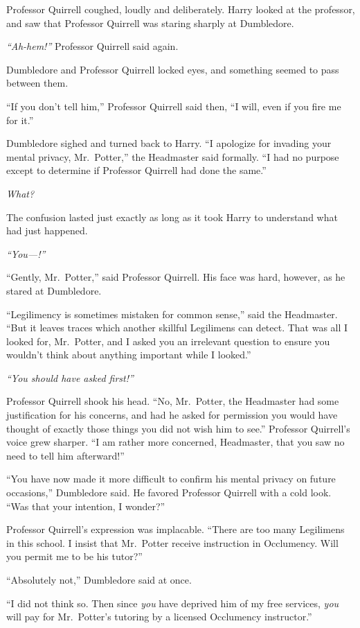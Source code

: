 Professor Quirrell coughed, loudly and deliberately. Harry looked at the
professor, and saw that Professor Quirrell was staring sharply at
Dumbledore.

\emph{``Ah-hem!''} Professor Quirrell said again.

Dumbledore and Professor Quirrell locked eyes, and something seemed to
pass between them.

``If you don't tell him,'' Professor Quirrell said then, ``I will, even
if you fire me for it.''

Dumbledore sighed and turned back to Harry. ``I apologize for invading
your mental privacy, Mr.~Potter,'' the Headmaster said formally. ``I had
no purpose except to determine if Professor Quirrell had done the
same.''

\emph{What?}

The confusion lasted just exactly as long as it took Harry to understand
what had just happened.

\emph{``You---!''}

``Gently, Mr.~Potter,'' said Professor Quirrell. His face was hard,
however, as he stared at Dumbledore.

``Legilimency is sometimes mistaken for common sense,'' said the
Headmaster. ``But it leaves traces which another skillful Legilimens can
detect. That was all I looked for, Mr.~Potter, and I asked you an
irrelevant question to ensure you wouldn't think about anything
important while I looked.''

\emph{``You should have asked first!''}

Professor Quirrell shook his head. ``No, Mr.~Potter, the Headmaster had
some justification for his concerns, and had he asked for permission you
would have thought of exactly those things you did not wish him to
see.'' Professor Quirrell's voice grew sharper. ``I am rather more
concerned, Headmaster, that you saw no need to tell him afterward!''

``You have now made it more difficult to confirm his mental privacy on
future occasions,'' Dumbledore said. He favored Professor Quirrell with
a cold look. ``Was that your intention, I wonder?''

Professor Quirrell's expression was implacable. ``There are too many
Legilimens in this school. I insist that Mr.~Potter receive instruction
in Occlumency. Will you permit me to be his tutor?''

``Absolutely not,'' Dumbledore said at once.

``I did not think so. Then since \emph{you} have deprived him of my free
services, \emph{you} will pay for Mr.~Potter's tutoring by a licensed
Occlumency instructor.''

